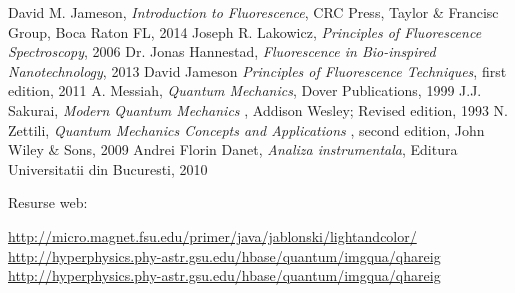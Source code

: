 \begin{thebibliography}{99}

 David M. Jameson, {\it Introduction to Fluorescence}, CRC Press, Taylor \& Francisc Group, Boca Raton FL, 2014
 Joseph R. Lakowicz, {\it Principles of Fluorescence Spectroscopy}, 2006
 Dr. Jonas Hannestad, {\it Fluorescence in Bio-inspired Nanotechnology}, 2013
 David Jameson {\it Principles of Fluorescence Techniques}, first edition, 2011
 A. Messiah, {\it Quantum Mechanics},  Dover Publications, 1999
 J.J. Sakurai, {\it Modern Quantum Mechanics }, Addison Wesley; Revised edition, 1993
 N. Zettili, {\it Quantum Mechanics Concepts and Applications }, second edition, John Wiley \& Sons, 2009
 Andrei Florin Danet, {\it Analiza instrumentala}, Editura Universitatii din Bucuresti, 2010

Resurse web:

 \url{ http://micro.magnet.fsu.edu/primer/java/jablonski/lightandcolor/ }
  \url{ http://hyperphysics.phy-astr.gsu.edu/hbase/quantum/imgqua/qhareig }
  \url{ http://hyperphysics.phy-astr.gsu.edu/hbase/quantum/imgqua/qhareig }
\end{thebibliography}





